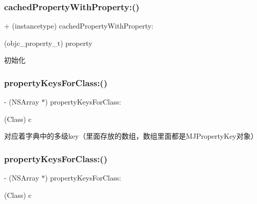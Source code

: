 \subsubsection{\texorpdfstring{cached\+Property\+With\+Property\+:()}{cachedPropertyWithProperty:()}\hspace{0.1cm}{\footnotesize\ttfamily [3/3]}}
{\footnotesize\ttfamily + (instancetype) cached\+Property\+With\+Property\+: \begin{DoxyParamCaption}\item[{(objc\+\_\+property\+\_\+t)}]{property }\end{DoxyParamCaption}}

初始化 \mbox{\label{interface_m_j_property_a0bb60a4e43e9c08eb17f9711c3313690}} 
\subsubsection{\texorpdfstring{property\+Keys\+For\+Class\+:()}{propertyKeysForClass:()}\hspace{0.1cm}{\footnotesize\ttfamily [1/3]}}
{\footnotesize\ttfamily -\/ (N\+S\+Array $\ast$) property\+Keys\+For\+Class\+: \begin{DoxyParamCaption}\item[{(Class)}]{c }\end{DoxyParamCaption}}

对应着字典中的多级key（里面存放的数组，数组里面都是\+M\+J\+Property\+Key对象） \mbox{\label{interface_m_j_property_a0bb60a4e43e9c08eb17f9711c3313690}} 
\subsubsection{\texorpdfstring{property\+Keys\+For\+Class\+:()}{propertyKeysForClass:()}\hspace{0.1cm}{\footnotesize\ttfamily [2/3]}}
{\footnotesize\ttfamily -\/ (N\+S\+Array $\ast$) property\+Keys\+For\+Class\+: \begin{DoxyParamCaption}\item[{(Class)}]{c }\end{DoxyParamCaption}}

